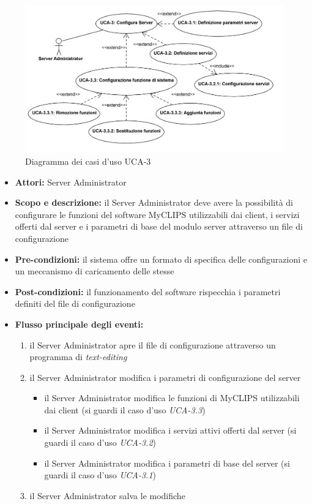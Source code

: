 
\begin{figure}
\centering
\includegraphics[width=1.1\textwidth]{Immagini/Capitolo2/UseCases/UCA-3.png}
\caption{Diagramma dei casi d'uso UCA-3}\label{fig:uc-uca-3}
\end{figure}

\begin{itemize}
	\item \textbf{Attori:} Server Administrator
	\item \textbf{Scopo e descrizione:} il Server Administrator deve avere la possibilità di configurare le funzioni del software MyCLIPS utilizzabili dai client, i servizi offerti dal server e i parametri di base del modulo server attraverso un file di configurazione
	\item \textbf{Pre-condizioni:} il sistema offre un formato di specifica delle configurazioni e un meccanismo di caricamento delle stesse
	\item \textbf{Post-condizioni:} il funzionamento del software rispecchia i parametri definiti del file di configurazione
	\item \textbf{Flusso principale degli eventi:}
		\begin{enumerate}
			\item il Server Administrator apre il file di configurazione attraverso un programma di \emph{text-editing}
			\item il Server Administrator modifica i parametri di configurazione del server
				\begin{itemize}
					\item il Server Administrator modifica le funzioni di MyCLIPS utilizzabili dai client (si guardi il caso d'uso \emph{UCA-3.3})
					\item il Server Administrator modifica i servizi attivi offerti dal server (si guardi il caso d'uso \emph{UCA-3.2})
					\item il Server Administrator modifica i parametri di base del server (si guardi il caso d'uso \emph{UCA-3.1})
				\end{itemize}
			\item il Server Administrator salva le modifiche
		\end{enumerate}
\end{itemize}


